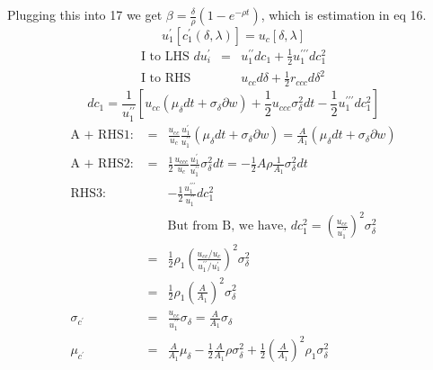 \documentclass[]{article}
\begin{document}
Plugging this into 17 we get $\beta = \frac{\delta}{\rho} (1-e^{-\rho t})$, which is estimation in eq 16.
\begin{equation}
u_1^\prime [c_1^\prime(\delta, \lambda)] = u_c[\delta, \lambda] \tag{A}
\end{equation}
\begin{eqnarray*}
\mbox{I to LHS } du_i^\prime &=& u_1^{\prime \prime} dc_1 + \frac{1}{2} u_1^{\prime \prime \prime} dc_1^2\\
\mbox{I to RHS } && u_{cc} d\delta + \frac{1}{2}r_{ccc} d\delta ^2
\end{eqnarray*}
\begin{equation}
dc_1 = \frac{1}{u_1^{\prime\prime}} \left[u_{cc}\left(\mu_\delta dt + \sigma_\delta \partial w\right) + \frac{1}{2}u_{ccc} \sigma_\delta^2 dt - \frac{1}{2} u_1^{\prime\prime\prime} dc_1^2\right] \tag{B}
\end{equation}
\begin{eqnarray*}
\mbox{A + RHS1: } &=& \frac{u_{cc}}{u_c} \frac{u_1^\prime}{u_1^{\prime\prime}} \left(\mu_\delta dt + \sigma_\delta \partial w\right) = \frac{A}{A_1} \left(\mu_\delta dt + \sigma_\delta \partial w\right)\\
\mbox{A + RHS2: } &=& \frac{1}{2}\frac{u_{ccc}}{u_c} \frac{u_1^\prime}{u_1^{\prime\prime}} \sigma_\delta^2 dt = -\frac{1}{2} A\rho \frac{1}{A_1} \sigma_\delta^2 dt\\
\mbox{RHS3: }&& -\frac{1}{2} \frac{u_1^{\prime\prime\prime}}{u_1^{\prime\prime}}dc_1^2\\
&& \mbox{But from B, we have, } dc_1^2 = \left(\frac{u_{cc}}{u_1^{\prime\prime}}\right)^2 \sigma_\delta^2\\
&=& \frac{1}{2}\rho_1 \left(\frac{u_{cc}/u_c}{u_1^{\prime\prime}/u_1^{\prime}}\right)^2\sigma_\delta^2\\
&=& \frac{1}{2} \rho_1 \left(\frac{A}{A_1}\right)^2 \sigma_\delta^2\\
\sigma_{c^\prime}&=& \frac{u_{cc}}{u_1^{\prime\prime}} \sigma_\delta = \frac{A}{A_1} \sigma_\delta\\
\mu_{c^\prime} &=& \frac{A}{A_1} \mu_\delta - \frac{1}{2} \frac{A}{A_1} \rho \sigma_\delta^2 + \frac{1}{2}\left(\frac{A}{A_1}\right)^2 \rho_1 \sigma_\delta^2
\end{eqnarray*}
\end{document}
